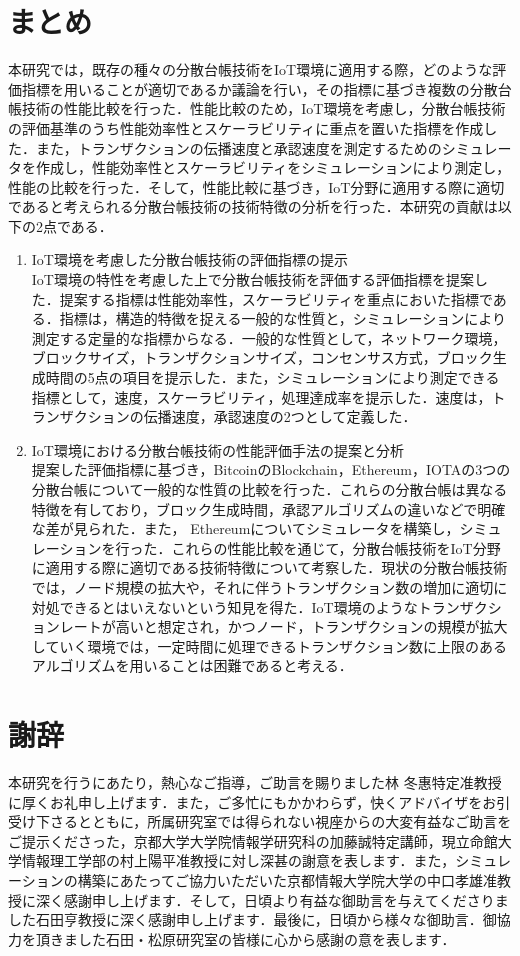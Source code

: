 \documentclass[japanese, macos]{KU2}
\begin{document}
\chapter{まとめ}
本研究では，既存の種々の分散台帳技術をIoT環境に適用する際，どのような評価指標を用いることが適切であるか議論を行い，その指標に基づき複数の分散台帳技術の性能比較を行った．性能比較のため，IoT環境を考慮し，分散台帳技術の評価基準のうち性能効率性とスケーラビリティに重点を置いた指標を作成した．また，トランザクションの伝播速度と承認速度を測定するためのシミュレータを作成し，性能効率性とスケーラビリティをシミュレーションにより測定し，性能の比較を行った．そして，性能比較に基づき，IoT分野に適用する際に適切であると考えられる分散台帳技術の技術特徴の分析を行った．本研究の貢献は以下の2点である．
\begin{enumerate}
\item IoT環境を考慮した分散台帳技術の評価指標の提示\\
IoT環境の特性を考慮した上で分散台帳技術を評価する評価指標を提案した．提案する指標は性能効率性，スケーラビリティを重点においた指標である．指標は，構造的特徴を捉える一般的な性質と，シミュレーションにより測定する定量的な指標からなる．一般的な性質として，ネットワーク環境，ブロックサイズ，トランザクションサイズ，コンセンサス方式，ブロック生成時間の5点の項目を提示した．また，シミュレーションにより測定できる指標として，速度，スケーラビリティ，処理達成率を提示した．速度は，トランザクションの伝播速度，承認速度の2つとして定義した．
\item IoT環境における分散台帳技術の性能評価手法の提案と分析\\
提案した評価指標に基づき，BitcoinのBlockchain，Ethereum，IOTAの3つの分散台帳について一般的な性質の比較を行った．これらの分散台帳は異なる特徴を有しており，ブロック生成時間，承認アルゴリズムの違いなどで明確な差が見られた．また， Ethereumについてシミュレータを構築し，シミュレーションを行った．これらの性能比較を通じて，分散台帳技術をIoT分野に適用する際に適切である技術特徴について考察した．現状の分散台帳技術では，ノード規模の拡大や，それに伴うトランザクション数の増加に適切に対処できるとはいえないという知見を得た．IoT環境のようなトランザクションレートが高いと想定され，かつノード，トランザクションの規模が拡大していく環境では，一定時間に処理できるトランザクション数に上限のあるアルゴリズムを用いることは困難であると考える．
\end{enumerate}


\chapter*{謝辞}
本研究を行うにあたり，熱心なご指導，ご助言を賜りました林 冬惠特定准教授に厚くお礼申し上げます．また，ご多忙にもかかわらず，快くアドバイザをお引受け下さるとともに，所属研究室では得られない視座からの大変有益なご助言をご提示くださった，京都大学大学院情報学研究科の加藤誠特定講師，現立命館大学情報理工学部の村上陽平准教授に対し深甚の謝意を表します．また，シミュレーションの構築にあたってご協力いただいた京都情報大学院大学の中口孝雄准教授に深く感謝申し上げます．そして，日頃より有益な御助言を与えてくださりました石田亨教授に深く感謝申し上げます．最後に，日頃から様々な御助言．御協力を頂きました石田・松原研究室の皆様に心から感謝の意を表します．

\end{document}
